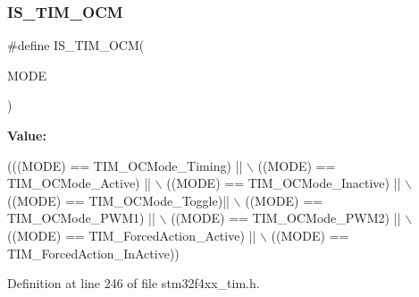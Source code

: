\subsubsection{\texorpdfstring{I\+S\+\_\+\+T\+I\+M\+\_\+\+O\+CM}{IS\_TIM\_OCM}}
{\footnotesize\ttfamily \#define I\+S\+\_\+\+T\+I\+M\+\_\+\+O\+CM(\begin{DoxyParamCaption}\item[{}]{M\+O\+DE }\end{DoxyParamCaption})}

{\bfseries Value\+:}
\begin{DoxyCode}
(((MODE) == TIM\_OCMode\_Timing) || \(\backslash\)
                          ((MODE) == TIM\_OCMode\_Active) || \(\backslash\)
                          ((MODE) == TIM\_OCMode\_Inactive) || \(\backslash\)
                          ((MODE) == TIM\_OCMode\_Toggle)|| \(\backslash\)
                          ((MODE) == TIM\_OCMode\_PWM1) || \(\backslash\)
                          ((MODE) == TIM\_OCMode\_PWM2) ||    \(\backslash\)
                          ((MODE) == TIM\_ForcedAction\_Active) || \(\backslash\)
                          ((MODE) == TIM\_ForcedAction\_InActive))
\end{DoxyCode}


Definition at line 246 of file stm32f4xx\+\_\+tim.\+h.


